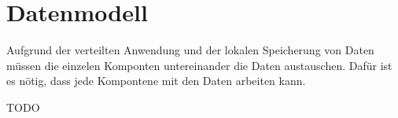 
\section{Datenmodell}

Aufgrund der verteilten Anwendung und der lokalen Speicherung von Daten müssen die einzelen Komponten untereinander die Daten austauschen. Dafür ist es nötig, dass jede Kompontene mit den Daten arbeiten kann.


TODO
